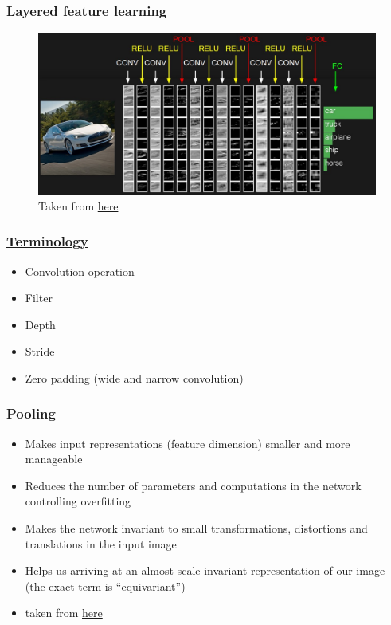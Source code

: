 \documentclass[color=usenames,dvipsnames]{beamer}
\begin{document}
\begin{frame}
\frametitle{Layered feature learning}

\begin{figure}
	\centering
	\includegraphics[width=0.8\linewidth]{../figures/convnet.jpeg}
	\caption{Taken from \href{http://cs231n.github.io/convolutional-networks/}{here}}
\end{figure}
\end{frame}

\begin{frame}
\frametitle{\href{https://ujjwalkarn.me/2016/08/11/intuitive-explanation-convnets/}{Terminology}}
\begin{itemize}
	\item Convolution operation
	\item Filter
	\item Depth
	\item Stride
	\item Zero padding (wide and narrow convolution)
\end{itemize}
\end{frame}

\begin{frame}
\frametitle{Pooling}
\begin{itemize}
	\item Makes input representations (feature dimension) smaller and more manageable
	\item Reduces the number of parameters and computations in the network controlling overfitting
	\item Makes the network invariant to small transformations, distortions and translations in the input image
	\item Helps us arriving at an almost scale invariant representation of our image (the exact term is “equivariant”)
	\item taken from \href{https://ujjwalkarn.me/2016/08/11/intuitive-explanation-convnets/}{here}
	
\end{itemize}


\end{frame}
\end{document}
